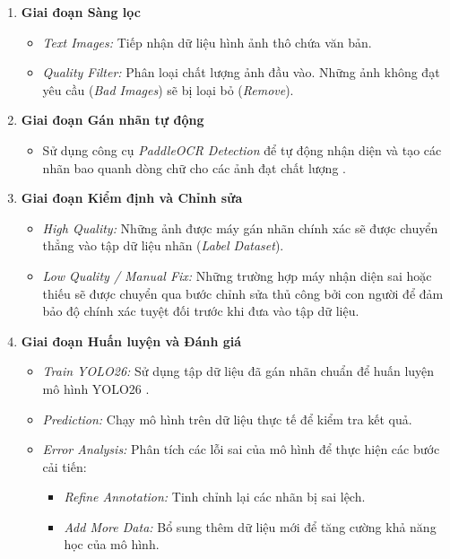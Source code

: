 \begin{enumerate}
    \item \textbf{Giai đoạn Sàng lọc}
    \begin{itemize}
        \item \textit{Text Images:} Tiếp nhận dữ liệu hình ảnh thô chứa văn bản.
        \item \textit{Quality Filter:} Phân loại chất lượng ảnh đầu vào. Những ảnh không đạt yêu cầu (\textit{Bad Images}) sẽ bị loại bỏ (\textit{Remove}).
    \end{itemize}

    \item \textbf{Giai đoạn Gán nhãn tự động}
    \begin{itemize}
        \item Sử dụng công cụ \textit{PaddleOCR Detection} để tự động nhận diện và tạo các nhãn bao quanh dòng chữ cho các ảnh đạt chất lượng \cite{Reference20}.
    \end{itemize}

    \item \textbf{Giai đoạn Kiểm định và Chỉnh sửa}
    \begin{itemize}
        \item \textit{High Quality:} Những ảnh được máy gán nhãn chính xác sẽ được chuyển thẳng vào tập dữ liệu nhãn (\textit{Label Dataset}).
        \item \textit{Low Quality / Manual Fix:} Những trường hợp máy nhận diện sai hoặc thiếu sẽ được chuyển qua bước chỉnh sửa thủ công bởi con người để đảm bảo độ chính xác tuyệt đối trước khi đưa vào tập dữ liệu.
    \end{itemize}

    \item \textbf{Giai đoạn Huấn luyện và Đánh giá}
    \begin{itemize}
        \item \textit{Train YOLO26:} Sử dụng tập dữ liệu đã gán nhãn chuẩn để huấn luyện mô hình YOLO26 \cite{Reference21}.
        \item \textit{Prediction:} Chạy mô hình trên dữ liệu thực tế để kiểm tra kết quả.
        \item \textit{Error Analysis:} Phân tích các lỗi sai của mô hình để thực hiện các bước cải tiến:
        \begin{itemize}
            \item \textit{Refine Annotation:} Tinh chỉnh lại các nhãn bị sai lệch.
            \item \textit{Add More Data:} Bổ sung thêm dữ liệu mới để tăng cường khả năng học của mô hình.
        \end{itemize}
    \end{itemize}
\end{enumerate}


